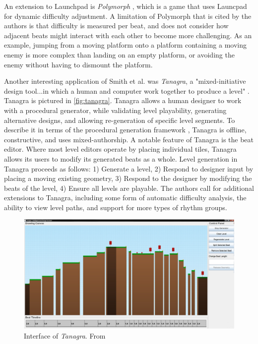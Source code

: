 An extension to Launchpad is \emph{Polymorph} \cite{jennings-teats2010}, which is a game
that uses Launcpad for dynamic difficulty adjustment. A limitation of Polymorph that is
cited by the authors is that difficulty is measured per beat, and does not consider how
adjacent beats might interact with each other to become more challenging. As an example,
jumping from a moving platform onto a platform containing a moving enemy is more complex
than landing on an empty platform, or avoiding the enemy without having to dismount the
platform.

Another interesting application of Smith et al. was \emph{Tanagra}, a "mixed-initiative
design tool...in which a human and computer work together to produce a level" 
\cite{smith2010}. Tanagra is pictured in \autoref{fig:tanagra}. Tanagra allows a human
designer to work with a procedural generator, while validating level playability, generating
alternative designs, and allowing re-generation of specific level segments. To describe it
in terms of the procedural generation framework \cite{togelius2011}, Tanagra is offline,
constructive, and uses mixed-authorship. A notable feature of Tanagra is the beat editor.
Where most level editors operate by placing individual tiles, Tanagra allows its users to
modify its generated beats as a whole. Level generation in Tanagra proceeds as follows:
1) Generate a level, 2) Respond to designer input by placing a moving existing geometry, 3)
Respond to the designer by modifying the beats of the level, 4) Ensure all levels are
playable. The authors call for additional extensions to Tanagra, including some form of
automatic difficulty analysis, the ability to view level paths, and support for more types
of rhythm groups.

\begin{figure}[ht]
    \centering
    \includegraphics[width=\linewidth]{img/fig6-tanagra.png}
    \caption{Interface of \emph{Tanagra}. From \cite{smith2010}}
    \label{fig:tanagra}
\end{figure}


